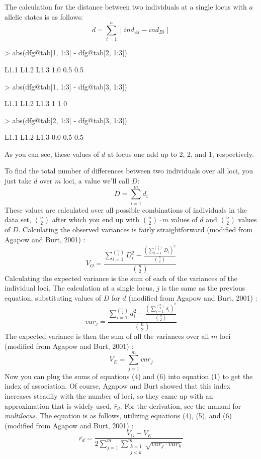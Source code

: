 \documentclass[letterpaper]{article}
\newcommand{\beq}{\begin{equation}}
\newcommand{\eeq}{\end{equation}}
\begin{document}
The calculation for the distance between two individuals at a single locus with $a$ allelic states is as follows:
\beq
d = \displaystyle \sum_{i=1}^{a} \mid ind_{Ai} - ind_{Bi}\mid
\eeq
\begin{Schunk}
\begin{Sinput}
> abs(dfg@tab[1, 1:3] - dfg@tab[2, 1:3])
\end{Sinput}
\begin{Soutput}
L1.1 L1.2 L1.3 
 1.0  0.5  0.5 
\end{Soutput}
\begin{Sinput}
> abs(dfg@tab[1, 1:3] - dfg@tab[3, 1:3])
\end{Sinput}
\begin{Soutput}
L1.1 L1.2 L1.3 
   1    1    0 
\end{Soutput}
\begin{Sinput}
> abs(dfg@tab[2, 1:3] - dfg@tab[3, 1:3])
\end{Sinput}
\begin{Soutput}
L1.1 L1.2 L1.3 
 0.0  0.5  0.5 
\end{Soutput}
\end{Schunk}
As you can see, these values of $d$ at locus one add up to 2, 2, and 1, respectively.

To find the total number of differences between two individuals over all loci, you just take $d$ over $m$ loci, a value we'll call $D$:
\beq
D = \displaystyle \sum_{i=1}^{m} d_i
\eeq
These values are calculated over all possible combinations of individuals in the data set, ${n \choose 2}$ after which you end up with ${n \choose 2}\cdot{}m$ values of $d$ and ${n \choose 2}$ values of $D$.
Calculating the observed variances is fairly straightforward (modified from Agapow and Burt, 2001) \cite{Agapow:2001}:
\beq
V_O = \frac{\displaystyle \sum_{i=1}^{n \choose 2} D_{i}^2 - \frac{(\displaystyle\sum_{i=1}^{n \choose 2} D_{i})^2}{{n \choose 2}}}{{n \choose 2}}
\eeq
Calculating the expected variance is the sum of each of the variances of the individual loci. The calculation at a single locus, $j$ is the same as the previous equation, substituting values of $D$ for $d$ (modified from Agapow and Burt, 2001) \cite{Agapow:2001}:
\beq
var_j = \frac{\displaystyle \sum_{i=1}^{n \choose 2} d_{i}^2 - \frac{(\displaystyle\sum_{i=1}^{n \choose 2} d_i)^2}{{n \choose 2}}}{{n \choose 2}}
\eeq
The expected variance is then the sum of all the variances over all $m$ loci (modified from Agapow and Burt, 2001) \cite{Agapow:2001}:
\beq
V_E = \displaystyle \sum_{j=1}^{m} var_j
\eeq
Now you can plug the sums of equations (4) and (6) into equation (1) to get the index of association.
Of course, Agapow and Burt showed that this index increases steadily with the number of loci, so they came up with an approximation that is widely used, $\bar r_d$. \cite{Agapow:2001} For the derivation, see the manual for \textit{multilocus}. The equation is as follows, utilizing equations (4), (5), and (6) (modified from Agapow and Burt, 2001) \cite{Agapow:2001}:
\beq
\bar{r_d} = \frac{V_O - V_E}
{2\displaystyle \sum_{j=1}^{m}\displaystyle \sum_{\substack{k=1\\ j<k}}^{m}\sqrt{var_j\cdot{}var_k}}
\eeq
\end{document}
